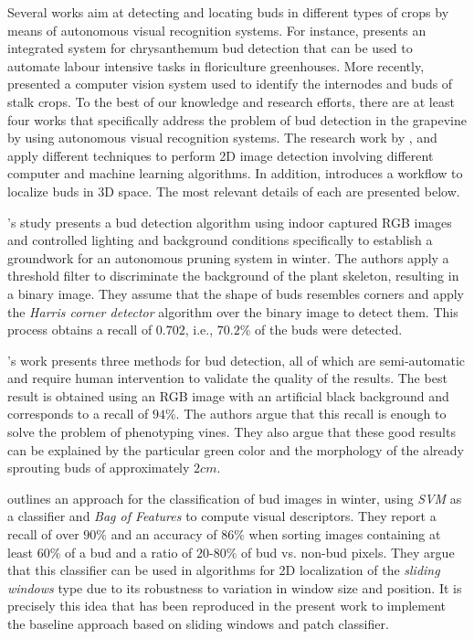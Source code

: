 \documentclass[a4paper,authoryear,review]{elsarticle}
\begin{document}
Several works aim at detecting and locating buds in different types of crops by means of autonomous visual recognition systems. For instance, \citet{tarry2014integrated} presents an integrated system for chrysanthemum bud detection that can be used to automate labour intensive tasks in floriculture greenhouses. More recently, \citet{zhao2018research} presented a   computer  vision system used to  identify the  internodes and  buds  of  stalk  crops. To the best of our knowledge and research efforts, there are at least four works that specifically address the problem of bud detection in the grapevine by using autonomous visual recognition systems. The research work by \citet{xu2014detection}, \citet{herzog2014initial} and \citet{perez2017image} apply different techniques to perform 2D image detection involving different computer and machine learning algorithms. In addition, \citet{diaz2018grapevine} introduces a workflow to localize buds in 3D space. The most relevant details of each are presented below.

\citet{xu2014detection}’s study presents a bud detection algorithm using indoor captured RGB images and controlled lighting and background conditions specifically to establish a groundwork for an autonomous pruning system in winter. The authors apply a threshold filter to discriminate the background of the plant skeleton, resulting in a binary image. They assume that the shape of buds resembles corners and apply the \emph{Harris corner detector} algorithm over the binary image to detect them. This process obtains a recall of $0.702$, i.e., $70.2\%$ of the buds were detected. 

\citet{herzog2014initial}’s work presents three methods for bud detection, all of which are semi-automatic and require human intervention to validate the quality of the results. The best result is obtained using an RGB image with an artificial black background and corresponds to a recall of $94\%$. The authors argue that this recall is enough to solve the problem of phenotyping vines. They also argue that these good results can be explained by the particular green color and the morphology of the already sprouting buds of approximately $2cm$.  

\citet{perez2017image} outlines an approach for the classification of bud images in winter, using \emph{SVM} as a classifier and \emph{Bag of Features} to compute visual descriptors. They report a recall of over $90\%$ and an accuracy of $86\%$ when sorting images containing at least $60\%$ of a bud and a ratio of $20$-$80\%$ of bud vs. non-bud pixels. They argue that this classifier can be used in algorithms for 2D localization of the \emph{sliding windows} type due to its robustness to variation in window size and position. It is precisely this idea that has been reproduced in the present work to implement the baseline approach based on sliding windows and patch classifier.
\end{document}
